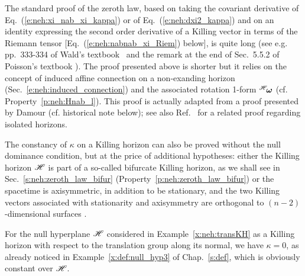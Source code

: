 \begin{remark}
\label{r:neh:proof_zeroth_law}
The standard proof of the zeroth law, based on taking the covariant derivative
of Eq.~(\ref{e:neh:xi_nab_xi_kappa}) \cite{BardeCH73,Carte87,Wald84} or of Eq.~(\ref{e:neh:dxi2_kappa})
\cite{Heusl96} and on an identity expressing the second order derivative of
a Killing vector in terms of the Riemann tensor [Eq.~(\ref{e:neh:nabnab_xi_Riem}) below], is quite long (see
e.g. pp.~333-334 of Wald's textbook~\cite{Wald84} and the remark at the end of Sec.~5.5.2 of Poisson's
textbook \cite{Poiss04}). The proof presented above is shorter but it relies on
the concept of induced affine connection on a non-exanding horizon
(Sec.~\ref{e:neh:induced_connection}) and the associated rotation
1-form ${}^{\mathscr{H}}\!\bm{\omega}$ (cf.
Property~\ref{p:neh:Hnab_l}). This proof is actually adapted from a proof
presented by Damour \cite{Damou79,Damou82} (cf. historical note below); see
also Ref.~\cite{AshteBL01} for a related proof regarding isolated horizons.
\end{remark}

\begin{remark}
\label{r:neh:zero_law_wo_NDEC}
The constancy of $\kappa$ on a Killing horizon can also be proved without the
null dominance condition, but at the price of additional hypotheses:
either the Killing horizon $\mathscr{H}$ is part of a so-called bifurcate Killing horizon,
as we shall see in Sec.~\ref{s:neh:zeroth_law_bifur} (Property~\ref{p:neh:zeroth_law_bifur})
or the spacetime is axisymmetric, in addition to be stationary, and
the two Killing vectors associated
with stationarity and
axisymmetry are orthogonal to $(n-2)$-dimensional
surfaces \cite{Carte73b,RaczW96}.
\end{remark}

\begin{example}
\label{x:neh:transKH_kappa}
For the null hyperplane $\mathscr{H}$ considered in Example~\ref{x:neh:transKH} as a Killing horizon with respect to the translation group along its normal, we have
$\kappa = 0$, as already noticed in Example~\ref{x:def:null_hyp3} of Chap.~\ref{s:def},
which is obviously constant over $\mathscr{H}$.
\end{example}

